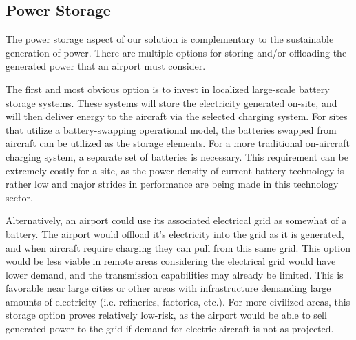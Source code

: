 \documentclass[../main.tex]{subfiles}
\begin{document}
\subsection{Power Storage} %
The power storage aspect of our solution is complementary to the sustainable generation of power.  There are multiple options for storing and/or offloading the generated power that an airport must consider.\par 

The first and most obvious option is to invest in localized large-scale battery storage systems. These systems will store the electricity generated on-site, and will then deliver energy to the aircraft via the selected charging system. For sites that utilize a battery-swapping operational model, the batteries swapped from aircraft can be utilized as the storage elements. For a more traditional on-aircraft charging system, a separate set of batteries is necessary. This requirement can be extremely costly for a site, as the power density of current battery technology is rather low and major strides in performance are being made in this technology sector.\par
Alternatively, an airport could use its associated electrical grid as somewhat of a battery. The airport would offload it's  electricity into the grid as it is generated, and when aircraft require charging they can pull from this same grid. This option would be less viable in remote areas considering the electrical grid would have lower demand, and the transmission capabilities may already be limited. This is favorable near large cities or other areas with infrastructure demanding large amounts of electricity (i.e. refineries, factories, etc.). For more civilized areas, this storage option proves relatively low-risk, as the airport would be able to sell generated power to the grid if demand for electric aircraft is not as projected.\par
\end{document}
